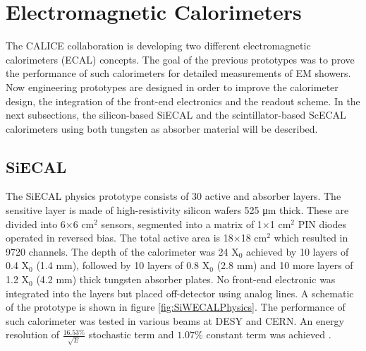 \section{Electromagnetic Calorimeters}

The CALICE collaboration is developing two different electromagnetic calorimeters (ECAL) concepts. The goal of the previous prototypes was to prove the performance of such calorimeters for detailed measurements of EM showers. Now engineering prototypes are designed in order to improve the calorimeter design, the integration of the front-end electronics and the readout scheme. In the next subsections, the silicon-based SiECAL and the scintillator-based ScECAL calorimeters using both tungsten as absorber material will be described.

\subsection{SiECAL}

The SiECAL physics prototype \cite{1748-0221-3-08-P08001} consists of 30 active and absorber layers. The sensitive layer is made of high-resistivity silicon wafers 525 \si{\micro\meter} thick. These are divided into 6$\times$6 cm$^2$ sensors, segmented into a matrix of 1$\times$1 cm$^2$ PIN diodes operated in reversed bias. The total active area is 18$\times$18 cm$^2$ which resulted in 9720 channels. The depth of the calorimeter was 24 X$_0$ achieved by 10 layers of 0.4 X$_0$ (1.4 mm), followed by 10 layers of 0.8 X$_0$ (2.8 mm) and 10 more layers of 1.2 X$_0$ (4.2 mm) thick tungsten absorber plates. No front-end electronic was integrated into the layers but placed off-detector using analog lines. A schematic of the prototype is shown in figure \ref{fig:SiWECALPhysics}. The performance of such calorimeter was tested in various beams at DESY and CERN. An energy resolution of $\frac{16.53\%}{\sqrt{E}}$ stochastic term and $1.07\%$ constant term was achieved \cite{ADLOFF2009372}.

